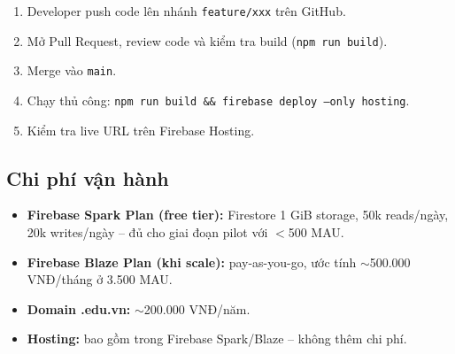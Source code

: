 \begin{enumerate}
  \item Developer push code lên nhánh \texttt{feature/xxx} trên GitHub.
  \item Mở Pull Request, review code và kiểm tra build (\texttt{npm run build}).
  \item Merge vào \texttt{main}.
  \item Chạy thủ công: \texttt{npm run build \&\& firebase deploy --only hosting}.
  \item Kiểm tra live URL trên Firebase Hosting.
\end{enumerate}

\subsection{Chi phí vận hành}

\begin{itemize}
  \item \textbf{Firebase Spark Plan (free tier):} Firestore 1 GiB storage, 50k reads/ngày,
    20k writes/ngày -- đủ cho giai đoạn pilot với $<$500 MAU.
  \item \textbf{Firebase Blaze Plan (khi scale):} pay-as-you-go, ước tính
    $\sim$500.000 VNĐ/tháng ở 3.500 MAU.
  \item \textbf{Domain .edu.vn:} $\sim$200.000 VNĐ/năm.
  \item \textbf{Hosting:} bao gồm trong Firebase Spark/Blaze -- không thêm chi phí.
\end{itemize}
